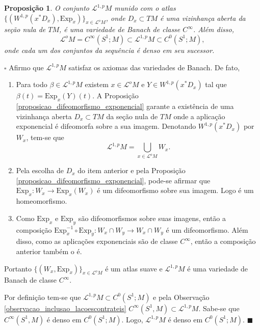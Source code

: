 \documentclass[12pt]{book}
\newtheorem{proposicao}[teorema]{Proposição}
\newenvironment{prova}[1]{$\square$ #1}{\hfill$\blacksquare$}
\newcommand{\aplicaoessuaves}[2]{C^{\infty}(#1, #2)}
\newcommand{\caminhosexponenciaisSobolev}{\mathcal{L}^{1,p}M}
\newcommand{\circulo}{S^{1}}
\newcommand{\espacosobolev}[1]{W^{1,p}(#1)}
\newcommand{\Exp}{\text{Exp}}
\newcommand{\lacocontrateis}{\mathcal{L}^{o}M}
\begin{document}
	\begin{proposicao}\label{proposicao_caminhos_variedade_banach}
		O conjunto $\caminhosexponenciaisSobolev$ munido com o atlas $\{(\espacosobolev{x^{*}D_{x}}, \Exp_{x})\}_{x \in \lacocontrateis }$, onde $D_{x} \subset TM$ é uma vizinhança aberta da seção nula de $TM$, é uma variedade de Banach de classe $C^{\infty}$. Além disso, 
		$$
		\lacocontrateis = C^{\infty}(\circulo;M) \subset  \caminhosexponenciaisSobolev\subset C^{0}(\circulo;M),
		$$
		onde cada um dos conjuntos da sequência é denso em seu sucessor.
	\end{proposicao}
	\begin{prova}
		Afirmo que $\caminhosexponenciaisSobolev$ satisfaz os axiomas das variedades de Banach. De fato,
		\begin{enumerate}
			\item Para todo $\beta \in \caminhosexponenciaisSobolev $ existem $x \in \lacocontrateis$ e $Y \in \espacosobolev{x^{*}D_{x}}$ tal que $\beta(t)=\Exp_{x}(Y)(t)$. A Proposição \ref{proposicao_difeomorfismo_exponencial} garante a existência de uma vizinhança aberta $D_{x} \subset TM$ da seção nula de $TM$ onde a aplicação exponencial é difeomorfa sobre a sua imagem. Denotando $\espacosobolev{x^{*}D_{x}}$ por $W_{x}$, tem-se que
			$$
			\caminhosexponenciaisSobolev = \bigcup_{x \in \lacocontrateis} W_{x}.
			$$
			
			\item Pela escolha de $D_{x}$ do item anterior e pela Proposição \ref{proposicao_difeomorfismo_exponencial}, pode-se afirmar que $\Exp_{x}:W_{x} \to \Exp_{x}(W_{x})$ é um difeomorfismo sobre sua imagem. Logo é um homeomorfismo.
			
			\item Como $\Exp_{x}$ e $\Exp_{y}$ são difeomorfismos sobre suas imagens, então a composição $\Exp_{x}^{-1} \circ \Exp_{y} :W_{x} \cap W_{y} \to W_{x} \cap W_{y}$ é um difeomorfismo. Além disso, como as aplicações exponenciais são de classe $C^{\infty}$, então a composição anterior também o é.
		\end{enumerate}
		
		Portanto $\{(W_{x}, \Exp_{x}) \}_{x \in \lacocontrateis}$ é um atlas suave e $\caminhosexponenciaisSobolev$ é uma variedade de Banach de classe $C^{\infty}$. 
		
		Por definição tem-se que $\caminhosexponenciaisSobolev\subset C^{0}(\circulo;M)$ e pela Observação \ref{observacao_inclusao_lacoescontrateis} $\aplicaoessuaves{\circulo}{M} \subset \caminhosexponenciaisSobolev$. Sabe-se que $\aplicaoessuaves{\circulo}{M}$ é denso em $C^{0}(\circulo;M)$. Logo, $\caminhosexponenciaisSobolev$ é denso em $C^{0}(\circulo;M)$.
	\end{prova}
	
\end{document}
